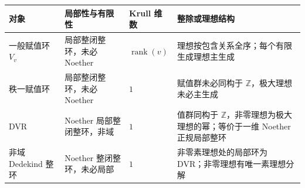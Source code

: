 \begin{center}
	\begin{minipage}{\textwidth}
		\makeatletter
		\def\@captype{table}
		\makeatother
		\centering
		\caption[赋值环、DVR 与 Dedekind 整环]{赋值环、DVR 与 Dedekind 整环。赋值环行中，\(v:K^*\to\Gamma\) 为域 \(K\) 上的满赋值，\(V_v\) 为其赋值环。Dedekind 整环行限定为非域，其定义及全局理想分解见。}
		\label{b3:tab:valuation-dvr-dedekind}
		\begin{tabularx}{\textwidth}{@{}>{\raggedright\arraybackslash}p{}>{\raggedright\arraybackslash}p{}>{\raggedright\arraybackslash}p{}>{\raggedright\arraybackslash}X@{}}
			\toprule
			对象 & 局部性与有限性 & Krull 维数 & 整除或理想结构\\
			\midrule
			一般赋值环 \(V_v\) & 局部整闭整环，未必 Noether & \(\operatorname{rank}(v)\) & 理想按包含关系全序；每个有限生成理想主生成\\
			秩一赋值环 & 局部整闭整环，未必 Noether & \(1\) & 赋值群未必同构于 \(\mathbb Z\)，极大理想未必主生成\\
			DVR & Noether 局部整闭整环，非域 & \(1\) & 值群同构于 \(\mathbb Z\)，非零理想为极大理想的幂；等价于一维 Noether 正规局部整环\\
			非域 Dedekind 整环 & Noether 整闭整环，未必局部 & \(1\) & 非零素理想处的局部环为 DVR；非零理想有唯一素理想分解\\
			\bottomrule
		\end{tabularx}
	\end{minipage}
\end{center}
